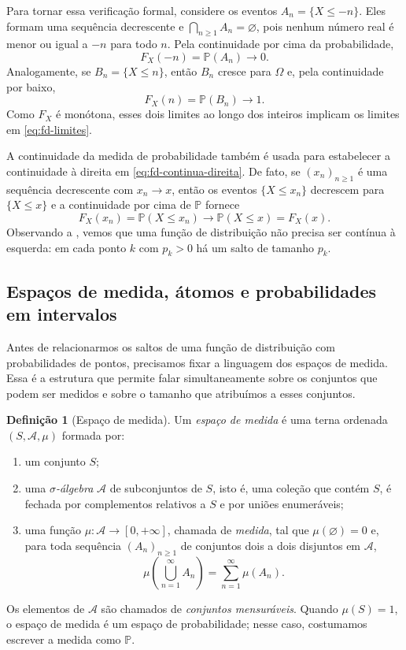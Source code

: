 \documentclass[12pt,portuguese]{article}
\theoremstyle{definition}
\newtheorem{definition}[definition]{Definição}
\theoremstyle{plainexercise}
\theoremstyle{starredexercise}
\theoremstyle{definition}
\begin{document}
Para tornar essa verificação formal, considere os eventos
$A_n=\{X\leqslant-n\}$. Eles formam uma sequência decrescente e
$\bigcap_{n\geqslant1}A_n=\varnothing$, pois nenhum número real é menor ou
igual a $-n$ para todo $n$. Pela continuidade por cima da probabilidade,
\[
  F_X(-n)=\mathbb{P}(A_n)\longrightarrow 0.
\]
Analogamente, se $B_n=\{X\leqslant n\}$, então $B_n$ cresce para $\Omega$ e,
pela continuidade por baixo,
\[
  F_X(n)=\mathbb{P}(B_n)\longrightarrow 1.
\]
Como $F_X$ é monótona, esses dois limites ao longo dos inteiros implicam os
limites em \eqref{eq:fd-limites}.

A continuidade da medida de probabilidade também é usada para
estabelecer a continuidade à direita em \eqref{eq:fd-continua-direita}. De
fato, se $(x_n)_{n\geqslant1}$ é uma sequência decrescente com $x_n\to x$,
então os eventos $\{X\leqslant x_n\}$ decrescem para $\{X\leqslant x\}$ e a
continuidade por cima de $\mathbb{P}$ fornece
\[
  F_X(x_n)=\mathbb{P}(X\leqslant x_n)\to\mathbb{P}(X\leqslant x)=F_X(x).
\]
Observando a , vemos que uma função de distribuição não
precisa ser contínua à esquerda: em cada ponto $k$ com $p_k>0$ há um salto de
tamanho $p_k$.

\subsection{Espaços de medida, átomos e probabilidades em intervalos}

Antes de relacionarmos os saltos de uma função de distribuição com
probabilidades de pontos, precisamos fixar a linguagem dos espaços de medida.
Essa é a estrutura que permite falar simultaneamente sobre os conjuntos que
podem ser medidos e sobre o tamanho que atribuímos a esses conjuntos.

\begin{definition}[Espaço de medida]
Um \emph{espaço de medida} é uma terna ordenada $(S,\mathcal{A},\mu)$ formada por:
\begin{enumerate}[label=\textup{(\roman*)}]
  \item um conjunto $S$;
  \item uma \emph{$\sigma$-álgebra} $\mathcal{A}$ de subconjuntos de $S$,
  isto é, uma coleção que contém $S$, é fechada por complementos relativos a
  $S$ e por uniões enumeráveis;
  \item uma função $\mu:\mathcal{A}\to[0,+\infty]$, chamada de \emph{medida},
  tal que $\mu(\varnothing)=0$ e, para toda sequência $(A_n)_{n\geqslant1}$
  de conjuntos dois a dois disjuntos em $\mathcal{A}$,
  \begin{equation*}
    \mu\!\left(\bigcup_{n=1}^{\infty}A_n\right)
    =\sum_{n=1}^{\infty}\mu(A_n).
  \end{equation*}
\end{enumerate}
Os elementos de $\mathcal{A}$ são chamados de \emph{conjuntos mensuráveis}.
Quando $\mu(S)=1$, o espaço de medida é um espaço de probabilidade; nesse
caso, costumamos escrever a medida como $\mathbb{P}$.
\end{definition}
\end{document}

